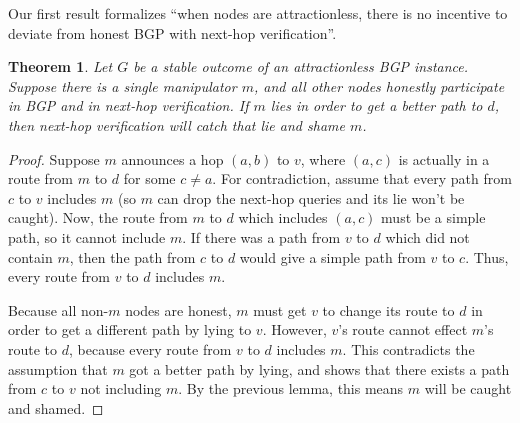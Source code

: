 \documentclass[12pt]{article}
\newtheorem{theorem}{Theorem}
\begin{document}
  Our first result formalizes ``when nodes are attractionless,
  there is no incentive to deviate from honest BGP with next-hop verification''.
  \begin{theorem}
    Let $G$ be a stable outcome of an attractionless BGP instance.
    Suppose there is a single manipulator $m$,
    and all other nodes honestly participate in BGP and in next-hop verification.
    If $m$ lies in order to get a better path to $d$,
    then next-hop verification will catch that lie and shame $m$.
  \end{theorem}
  \begin{proof}
    Suppose $m$ announces a hop $(a,b)$ to $v$, where $(a,c)$ is actually in
    a route from $m$ to $d$ for some $c\ne a$.
    For contradiction, assume that every path from $c$ to $v$ includes $m$
    (so $m$ can drop the next-hop queries and its lie won't be caught).
    Now, the route from $m$ to $d$ which includes $(a,c)$ must be a simple
    path, so it cannot include $m$.
    If there was a path from $v$ to $d$ which did not contain $m$, then the
    path from $c$ to $d$ would give a simple path from $v$ to $c$.
    Thus, every route from $v$ to $d$ includes $m$.

    Because all non-$m$ nodes are honest, $m$ must get $v$ to change its route
    to $d$ in order to get a different path by lying to $v$.
    However, $v$'s route cannot effect $m$'s route to $d$, because
    every route from $v$ to $d$ includes $m$.
    This contradicts the assumption that $m$ got a better path by lying,
    and shows that there exists a path from $c$ to $v$ not including $m$.
    By the previous lemma, this means $m$ will be caught and shamed.
  \end{proof}
\end{document}
